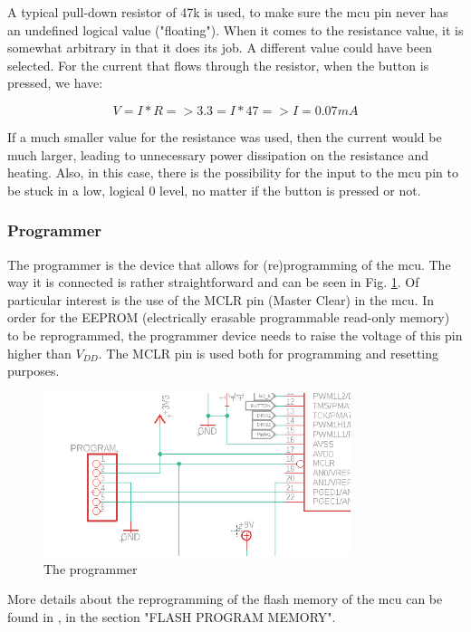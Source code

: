 \FloatBarrier
\noindent
A typical pull-down resistor of 47k is used, to make sure the mcu pin never has an undefined logical value ("floating"). When it comes to the resistance value, it is somewhat arbitrary in that it does its job. A different value could have been selected.
For the current that flows through the resistor, when the button is pressed, we have:

$$V = I*R => 3.3 = I*47 => I = 0.07mA$$

If a much smaller value for the resistance was used, then the current would be much larger, leading to unnecessary power dissipation on the resistance and heating. Also, in this case, there is the possibility for the input to the mcu pin to be stuck in a low, logical 0 level, no matter if the button is pressed or not.

\vspace{1cm}


\subsubsection{Programmer}

The programmer is the device that allows for (re)programming of the mcu. The way it is connected is rather straightforward and can be seen in Fig. \ref{fig:programmer}.
Of particular interest is the use of the MCLR pin (Master Clear) in the mcu. In order for the EEPROM (electrically erasable programmable read-only memory) to be reprogrammed, the programmer device needs to raise the voltage of this pin higher than $V_{DD}$. The MCLR pin is used both for programming and resetting purposes.

\begin{figure}[htb]
    \centering
    \includegraphics[width=0.8\textwidth]{figures/hardware/Programmer.PNG}
    \caption{The programmer}
    \label{fig:programmer}
\end{figure}

\noindent
More details about the reprogramming of the flash memory of the mcu can be found in \cite{mcu}, in the section "FLASH PROGRAM MEMORY".

